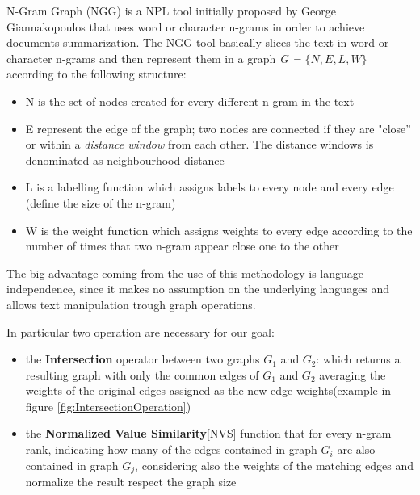 N-Gram Graph (NGG) is a NPL tool initially proposed by George Giannakopoulos \cite{Ngram} that uses word or character n-grams in order to achieve documents summarization. The NGG tool basically slices the text in word or character n-grams and then represent them in a graph \emph{G = $\lbrace N,E,L,W\rbrace$} according to the following structure:
\begin{itemize}
	\item N is the set of nodes created for every different n-gram in the text
	\item E represent the edge of the graph; two nodes are connected if they are "close'' or within a \emph{distance window} from each other. The distance windows is denominated as neighbourhood distance
	\item L is a labelling function which assigns labels to every node and every edge (define the size of the n-gram)
	\item W is the weight function which assigns weights to every edge according to the number of times that two n-gram appear close one to the other
\end{itemize}

The big advantage coming from the use of this methodology is language
independence, since it makes no assumption on the underlying languages and
allows text manipulation trough graph operations.

In particular two operation are necessary for our goal:
\begin{itemize}
\item the \textbf{Intersection} operator between two graphs $G_1$ and $G_2$: which returns a resulting graph with only the common edges of $G_1$ and $G_2$ averaging the weights of the original edges assigned as the new edge weights(example in figure \ref{fig:IntersectionOperation})
\item the \textbf{Normalized Value Similarity}[NVS] function that for every n-gram rank, indicating how many of the edges contained in graph $G_i$ are also contained in graph $G_j$, considering also the weights of the matching edges and normalize the result respect the graph size
\end{itemize}
 
